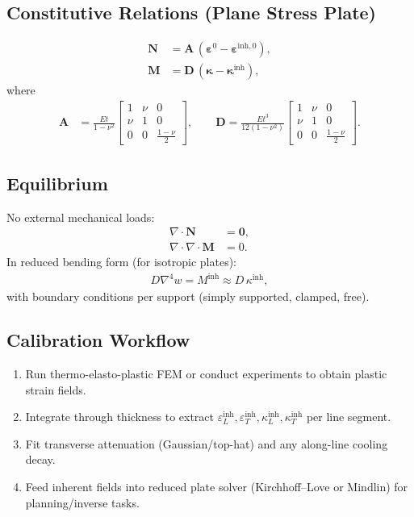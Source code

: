 \documentclass[11pt]{article}
\begin{document}
\subsection{Constitutive Relations (Plane Stress Plate)}
\begin{align}
  \mathbf{N} &= \mathbf{A}\,(\boldsymbol\varepsilon^0 - \boldsymbol\varepsilon^{\text{inh},0}), \\
  \mathbf{M} &= \mathbf{D}\,(\boldsymbol\kappa - \boldsymbol\kappa^{\text{inh}}),
\end{align}
where
\begin{align}
  \mathbf{A} &= \frac{Et}{1-\nu^2}
  \begin{bmatrix}
    1 & \nu & 0 \\
    \nu & 1 & 0 \\
    0 & 0 & \tfrac{1-\nu}{2}
  \end{bmatrix}, \qquad
  \mathbf{D} = \frac{Et^3}{12(1-\nu^2)}
  \begin{bmatrix}
    1 & \nu & 0 \\
    \nu & 1 & 0 \\
    0 & 0 & \tfrac{1-\nu}{2}
  \end{bmatrix}.
\end{align}

\subsection{Equilibrium}
No external mechanical loads:
\begin{align}
  \nabla \cdot \mathbf{N} &= \mathbf{0}, \\
  \nabla \cdot \nabla \cdot \mathbf{M} &= 0.
\end{align}
In reduced bending form (for isotropic plates):
\begin{align}
  D \nabla^4 w = M^{\text{inh}} \approx D\,\kappa^{\text{inh}},
\end{align}
with boundary conditions per support (simply supported, clamped, free).

\subsection{Calibration Workflow}
\begin{enumerate}
  \item Run thermo-elasto-plastic FEM or conduct experiments to obtain plastic strain fields.
  \item Integrate through thickness to extract \(\varepsilon_L^{\text{inh}}, \varepsilon_T^{\text{inh}}, \kappa_L^{\text{inh}}, \kappa_T^{\text{inh}}\) per line segment.
  \item Fit transverse attenuation (Gaussian/top-hat) and any along-line cooling decay.
  \item Feed inherent fields into reduced plate solver (Kirchhoff--Love or Mindlin) for planning/inverse tasks.
\end{enumerate}
\end{document}
